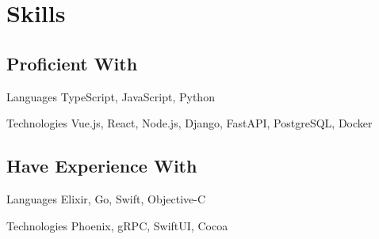 \section{\faCode{} Skills}

\subsection
{Proficient With}

\cvline
{Languages}
{TypeScript, JavaScript, Python}

\cvline
{Technologies}
{Vue.js, React, Node.js, Django, FastAPI, PostgreSQL, Docker}


\subsection
{Have Experience With}

\cvline
{Languages}
{Elixir, Go, Swift, Objective-C}

\cvline
{Technologies}
{Phoenix, gRPC, SwiftUI, Cocoa}